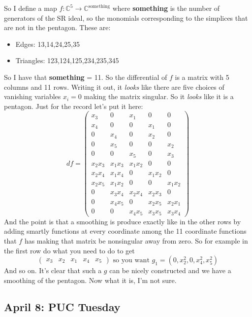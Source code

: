 \begin{exercise}[Pentagon]\leavevmode
	So I define a map \(f:\mathbb{C}^5 \to \mathbb{C}^{\text{something} }\) where  \textbf{something} is the number of generators of the SR ideal, so the monomials corresponding to the simplices that are not in the pentagon. These are:
	\begin{itemize}
	\item Edges: 13,14,24,25,35
	\item Triangles: 123,124,125,234,235,345
	\end{itemize}
	So I have that \textbf{something} = 11. So the differential of \(f\) is a matrix with 5 columns and 11 rows. Writing it out, it \textit{looks} like there are five choices of vanishing variables \(x_i=0\) making the matrix singular. So it \textit{looks} like it is a pentagon. Just for the record let's put it here:
	\[df=\begin{pmatrix} x_3&0&x_1&0&0\\x_4&0&0&x_1&0\\0&x_4&0&x_2&0\\0&x_5&0&0&x_2\\0&0&x_5&0&x_3\\x_2x_3&x_1x_3&x_1x_2&0&0\\x_2x_4&x_1x_4&0&x_1x_2&0\\x_2x_5&x_1x_2&0&0&x_1x_2\\0&x_3x_4&x_2x_4&x_2x_3&0\\0&x_4x_5&0&x_2x_5&x_2x_1\\0&0&x_4x_5&x_3x_5&x_3x_4 \end{pmatrix} \]
And the point is that a smoothing is produce exactly like in the other rows by adding smartly functions at every coordinate among the 11 coordinate functions that \(f\) has making that matrix be nonsingular away from zero. So for example in the first row do what you need to do to get
\[\begin{pmatrix} x_3&x_2&x_1&x_4&x_5 \end{pmatrix} \text{ so you want }g_1=(0,x_2^2,0,x_4^2,x_5^2)\]
And so on. It's clear that such a \(g\) can be nicely constructed and we have a smoothing of the pentagon. Now what it is, I'm not sure.

\end{exercise}

\subsection{April 8: PUC Tuesday}

